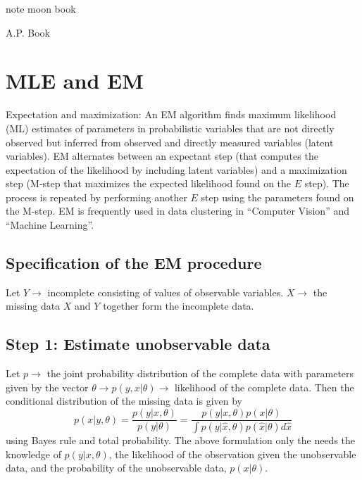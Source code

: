 \documentclass[11pt]{article}
\begin{document}
note moon book


A.P.  Book 

\section{MLE and EM}
Expectation and maximization:  An EM algorithm finds maximum likelihood (ML) estimates of parameters in probabilistic variables that are not directly observed but inferred from observed and directly measured variables (latent variables).  EM alternates between an expectant step (that computes the expectation of the likelihood by including latent variables) and a maximization step (M-step that maximizes the expected likelihood found on the $E$ step).  The process is repeated by performing another $E$ step using the parameters found on the M-step.  EM is frequently used in data clustering in ``Computer Vision'' and ``Machine Learning''.  

\subsection{Specification of the EM procedure}
Let $Y\to$ incomplete consisting of values of observable variables.  $X \to $ the missing data $X$ and $Y$ together form the incomplete data.

\subsection{Step 1: Estimate unobservable data}
Let $p\to$ the joint probability distribution of the complete data with parameters given by the vector $\theta \to p(y, x| \theta) \to$  likelihood of the complete data.  Then the conditional distribution of the missing data is given by 
\begin{equation}
p(x | y, \theta) = \frac{p(y| x, \theta)}{p(y | \theta)} = \frac{p(y| x, \theta) p(x | \theta)}{\int p(y| \hat{x}, \theta) p( \hat{x}| \theta) d\hat{x} }
\end{equation}
using Bayes rule and total probability.  The above formulation only the needs the knowledge of $p(y | x , \theta)$, the likelihood of the observation given the unobservable data, and the probability of the unobservable data, $p(x | \theta)$.  
\end{document}
